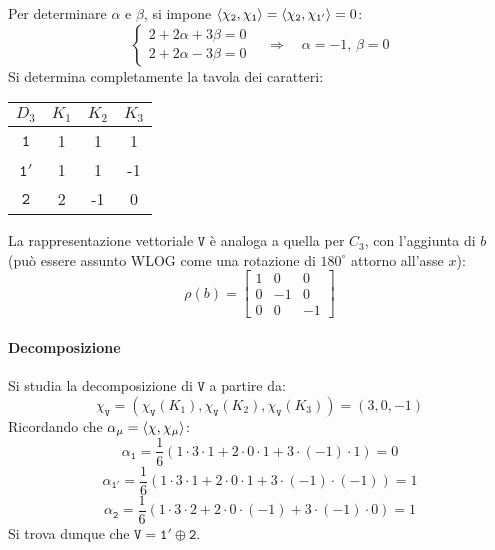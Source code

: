 Per determinare $ \alpha $ e $ \beta $, si impone $ \braket{\chi_{\mathtt{2}},\chi_{\mathtt{1}}} = \braket{\chi_{\mathtt{2}},\chi_{\mathtt{1}'}} = 0 $:
\begin{equation*}
	\begin{cases}
		2 + 2\alpha + 3\beta = 0 \\
		2 + 2\alpha - 3\beta = 0
	\end{cases}
	\quad \Rightarrow \quad
	\alpha = -1,\, \beta = 0
\end{equation*}
Si determina completamente la tavola dei caratteri:

\begin{table}[H]
	\centering
	\begin{tabular}{c|ccc}
		$ D_3 $ & $ K_1 $ & $ K_2 $ & $ K_3 $ \\
		\hline
		$ \mathtt{1} $ & 1 & 1 & 1 \\
		$ \mathtt{1}' $ & 1 & 1 & -1 \\
		$ \mathtt{2} $ & 2 & -1 & 0
	\end{tabular}
\end{table}

La rappresentazione vettoriale $ \mathtt{V} $ è analoga a quella per $ C_3 $, con l'aggiunta di $ b $ (può essere assunto WLOG come una rotazione di $ 180^{\circ} $ attorno all'asse $ x $):
\begin{equation*}
	\rho(b) =
	\begin{bmatrix}
		1 & 0 & 0 \\
		0 & -1 & 0 \\
		0 & 0 & -1
	\end{bmatrix}
\end{equation*}

\paragraph{Decomposizione}

Si studia la decomposizione di $ \mathtt{V} $ a partire da:
\begin{equation*}
	\chi_{\mathtt{V}} = (\chi_{\mathtt{V}}(K_1),\chi_{\mathtt{V}}(K_2),\chi_{\mathtt{V}}(K_3)) = (3,0,-1)
\end{equation*}
Ricordando che $ \alpha_{\mu} = \braket{\chi,\chi_{\mu}} $:
\begin{equation*}
	\alpha_{\mathtt{1}} = \frac{1}{6} (1 \cdot 3 \cdot 1 + 2 \cdot 0 \cdot 1 + 3 \cdot (-1) \cdot 1) = 0
\end{equation*}
\begin{equation*}
	\alpha_{\mathtt{1}'} = \frac{1}{6} (1 \cdot 3 \cdot 1 + 2 \cdot 0 \cdot 1 + 3 \cdot (-1) \cdot (-1)) = 1
\end{equation*}
\begin{equation*}
	\alpha_{\mathtt{2}} = \frac{1}{6} (1 \cdot 3 \cdot 2 + 2 \cdot 0 \cdot (-1) + 3 \cdot (-1) \cdot 0) = 1
\end{equation*}
Si trova dunque che $ \mathtt{V} = \mathtt{1}' \oplus \mathtt{2} $.

